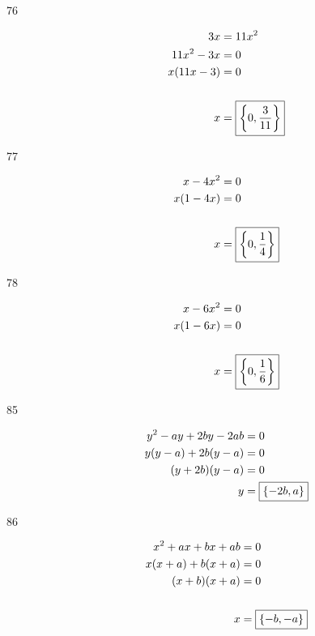 \documentclass[letterpaper]{exam}
\begin{document}
\begin{description}
      \item[76]
        \begin{align*}
        3x         & = 11x^2 \\
        11x^2 - 3x & = 0 \\
        x(11x - 3) & = 0 \\
        \\
        x          & = \boxed{ \cbr{ 0, \frac{3}{11} } } \\
        \end{align*}

      \item[77]
        \begin{align*}
          x - 4x^2  & = 0 \\
          x(1 - 4x) & = 0 \\
          \\
          x         & = \boxed{ \cbr{ 0, \frac{1}{4} } } \\
        \end{align*}

      \item[78]
      \begin{align*}
        x - 6x^2  & = 0 \\
        x(1 - 6x) & = 0 \\
        \\
        x         & = \boxed{ \cbr{ 0, \frac{1}{6} } } \\
      \end{align*}

      \item[85]
      \begin{align*}
        y^2 - ay + 2by - 2ab & = 0 \\
        y(y - a) + 2b(y - a) & = 0 \\
        (y + 2b)(y - a)      & = 0 \\
        y                    & = \boxed{ \cbr{ -2b, a } } \\
      \end{align*}

      \item[86]
        \begin{align*}
          x^2 + ax + bx + ab  & = 0 \\
          x(x + a) + b(x + a) & = 0 \\
          (x + b)(x + a)      & = 0 \\
          \\
          x                   & = \boxed{ \cbr{ -b, -a } }
        \end{align*}


\end{description}
\end{document}
